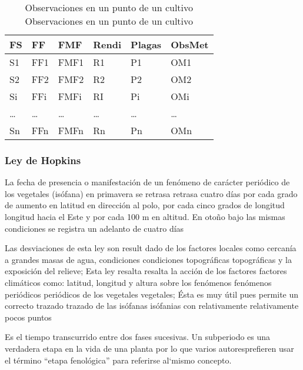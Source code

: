 \begin{table}[h!]
    \centering
    \begin{tabular}{@{}llllll@{}}
    \toprule
    FS  & FF  & FMF  & Rendi & Plagas & ObsMet \\ \midrule
    S1  & FF1 & FMF1 & R1    & P1     & OM1    \\
    S2  & FF2 & FMF2 & R2    & P2     & OM2    \\
    Si  & FFi & FMFi & RI    & Pi     & OMi    \\
    \dots & \dots & \dots  & \dots   & \dots    & \dots    \\
    Sn  & FFn & FMFn & Rn    & Pn     & OMn    \\ \bottomrule
    \end{tabular}
    \caption{Observaciones en un punto de un cultivo Observaciones en un punto de un cultivo}
    \label{tabma2}
\end{table}

\subsubsection{Ley de Hopkins}

La fecha de presencia o manifestación de un fenómeno de carácter periódico de los vegetales (isófana) en primavera se retrasa retrasa cuatro días por cada grado de aumento en latitud en dirección al polo, por cada cinco grados de longitud longitud hacia el Este y por cada 100 m en altitud. En otoño bajo las mismas condiciones se registra un adelanto de cuatro días


Las desviaciones de esta ley son result dado de los factores locales como cercanía a grandes masas de agua, condiciones condiciones topográficas topográficas y la exposición del relieve; Esta ley resalta resalta la acción de los factores factores climáticos como: latitud, longitud y altura sobre los fenómenos fenómenos periódicos periódicos de los vegetales vegetales; Ésta es muy útil pues permite un correcto trazado trazado de las isófanas isófanias con relativamente relativamente pocos puntos

\begin{definition}[Subperiodo]
    Es el tiempo transcurrido entre dos fases sucesivas. Un subperiodo es una verdadera etapa en la vida de una planta por lo que varios autoresprefieren usar el término ``etapa fenológica'' para referirse al`mismo concepto.
\end{definition}

